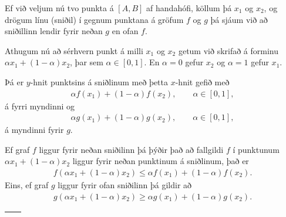 \documentclass[b5paper,11pt,icelandic]{sphinxmanual}
\begin{document}
Ef við veljum nú tvo punkta á \([A,B]\) af handahófi, köllum þá
\(x_1\) og \(x_2\), og drögum línu (sniðil) í gegnum punktana á
gröfum \(f\) og \(g\) þá sjáum við að sniðillinn lendir fyrir
neðan \(g\) en ofan \(f\).

Athugum nú að sérhvern punkt á milli \(x_1\) og \(x_2\) getum við skrifað á
forminu
\(\alpha x_1 + (1-\alpha)x_2\), þar sem \(\alpha \in [0,1]\). En \(\alpha=0\)
gefur \(x_2\) og \(\alpha=1\) gefur \(x_1\).

Þá er
\(y\)-hnit punktsins á sniðlinum með þetta \(x\)-hnit gefið með
\begin{equation*}
\begin{split}\alpha f(x_1) + (1-\alpha) f(x_2), \qquad \alpha \in [0,1],\end{split}
\end{equation*}
á fyrri myndinni og
\begin{equation*}
\begin{split}\alpha g(x_1) + (1-\alpha) g(x_2), \qquad \alpha \in [0,1],\end{split}
\end{equation*}
á myndinni fyrir \(g\).

Ef graf \(f\) liggur fyrir neðan sniðilinn þá þýðir það að fallgildi
\(f\) í punktunum \(\alpha x_1 + (1-\alpha)x_2\) liggur fyrir
neðan punktinum á sniðlinum, það er
\begin{equation*}
\begin{split}f(\alpha x_1+(1-\alpha)x_2)\leq \alpha f(x_1)+(1-\alpha)f(x_2).\end{split}
\end{equation*}
Eins, ef graf \(g\) liggur fyrir ofan sniðilinn þá gildir að
\begin{equation*}
\begin{split}g(\alpha x_1+(1-\alpha)x_2)\geq \alpha g(x_1)+(1-\alpha)g(x_2).\end{split}
\end{equation*}
\noindent\begin{tabulary}{\linewidth}{|L|L|}
\hline
{}\label{kafli05:figa3}
&\label{kafli05:figb3}
\\
\hline\end{tabulary}
\end{document}
